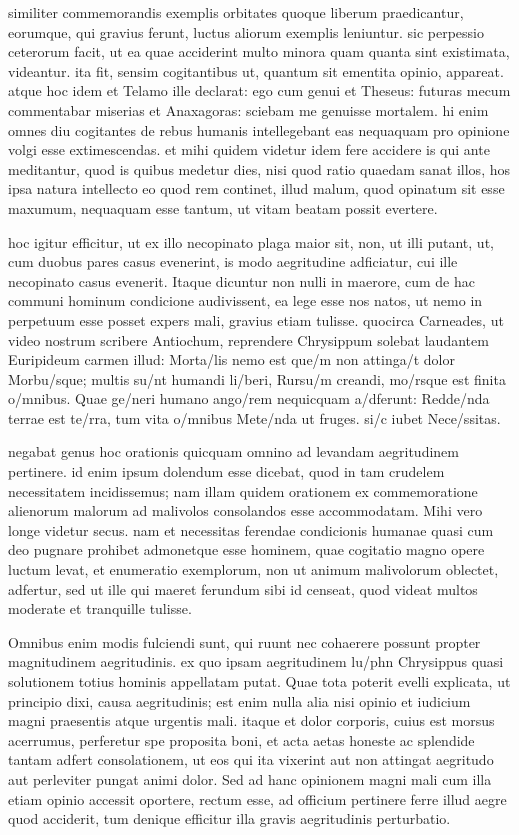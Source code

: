  similiter commemorandis exemplis orbitates quoque liberum praedicantur, eorumque, qui gravius ferunt, luctus aliorum exemplis leniuntur. sic perpessio ceterorum facit, ut ea quae acciderint multo minora quam quanta sint existimata, videantur. ita fit, sensim cogitantibus ut, quantum sit ementita opinio, appareat. atque hoc idem et Telamo ille declarat: ego cum genui et Theseus: futuras mecum commentabar miserias et Anaxagoras: sciebam me genuisse mortalem. hi enim omnes diu cogitantes de rebus humanis intellegebant eas nequaquam pro opinione volgi esse extimescendas. et mihi quidem videtur idem fere accidere is qui ante meditantur, quod is quibus medetur dies, nisi quod ratio quaedam sanat illos, hos ipsa natura intellecto eo quod rem continet, illud malum, quod opinatum sit esse maxumum, nequaquam esse tantum, ut vitam beatam possit evertere.

 hoc igitur efficitur, ut ex illo necopinato plaga maior sit, non, ut illi putant, ut, cum duobus pares casus evenerint, is modo aegritudine adficiatur, cui ille necopinato casus evenerit. Itaque dicuntur non nulli in maerore, cum de hac communi hominum condicione audivissent, ea lege esse nos natos, ut nemo in perpetuum esse posset expers mali, gravius etiam tulisse. quocirca Carneades, ut video nostrum scribere Antiochum, reprendere Chrysippum solebat laudantem Euripideum carmen illud: Morta/lis nemo est que/m non attinga/t dolor Morbu/sque; multis su/nt humandi li/beri, Rursu/m creandi, mo/rsque est finita o/mnibus. Quae ge/neri humano ango/rem nequicquam a/dferunt: Redde/nda terrae est te/rra, tum vita o/mnibus Mete/nda ut fruges. si/c iubet Nece/ssitas.

 negabat genus hoc orationis quicquam omnino ad levandam aegritudinem pertinere. id enim ipsum dolendum esse dicebat, quod in tam crudelem necessitatem incidissemus; nam illam quidem orationem ex commemoratione alienorum malorum ad malivolos consolandos esse accommodatam. Mihi vero longe videtur secus. nam et necessitas ferendae condicionis humanae quasi cum deo pugnare prohibet admonetque esse hominem, quae cogitatio magno opere luctum levat, et enumeratio exemplorum, non ut animum malivolorum oblectet, adfertur, sed ut ille qui maeret ferundum sibi id censeat, quod videat multos moderate et tranquille tulisse.

 Omnibus enim modis fulciendi sunt, qui ruunt nec cohaerere possunt propter magnitudinem aegritudinis. ex quo ipsam aegritudinem lu/phn Chrysippus quasi solutionem totius hominis appellatam putat. Quae tota poterit evelli explicata, ut principio dixi, causa aegritudinis; est enim nulla alia nisi opinio et iudicium magni praesentis atque urgentis mali. itaque et dolor corporis, cuius est morsus acerrumus, perferetur spe proposita boni, et acta aetas honeste ac splendide tantam adfert consolationem, ut eos qui ita vixerint aut non attingat aegritudo aut perleviter pungat animi dolor. Sed ad hanc opinionem magni mali cum illa etiam opinio accessit oportere, rectum esse, ad officium pertinere ferre illud aegre quod acciderit, tum denique efficitur illa gravis aegritudinis perturbatio.

